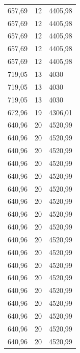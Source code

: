 \begin{center}
\begin{longtable}{|l|l|l|}
657,69            & 12               & 4405,98        \\
657,69            & 12               & 4405,98        \\
657,69            & 12               & 4405,98        \\
657,69            & 12               & 4405,98        \\
657,69            & 12               & 4405,98        \\
719,05            & 13               & 4030           \\
719,05            & 13               & 4030           \\
719,05            & 13               & 4030           \\
672,96            & 19               & 4306,01        \\
640,96            & 20               & 4520,99        \\
640,96            & 20               & 4520,99        \\
640,96            & 20               & 4520,99        \\
640,96            & 20               & 4520,99        \\
640,96            & 20               & 4520,99        \\
640,96            & 20               & 4520,99        \\
640,96            & 20               & 4520,99        \\
640,96            & 20               & 4520,99        \\
640,96            & 20               & 4520,99        \\
640,96            & 20               & 4520,99        \\
640,96            & 20               & 4520,99        \\
640,96            & 20               & 4520,99        \\
640,96            & 20               & 4520,99        \\
640,96            & 20               & 4520,99        \\
640,96            & 20               & 4520,99        \\
640,96            & 20               & 4520,99        \\
640,96            & 20               & 4520,99        \\
640,96            & 20               & 4520,99        \\

\end{longtable}
\end{center}
